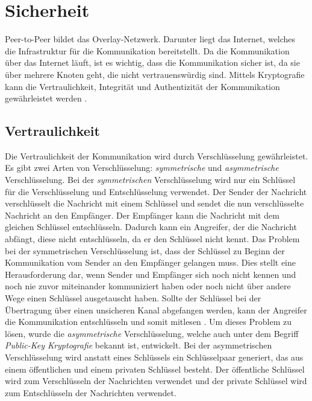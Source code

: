 \section{Sicherheit}
\label{sec:sicherheit_basics}


Peer-to-Peer bildet das Overlay-Netzwerk. Darunter liegt das Internet, welches die Infrastruktur für die Kommunikation bereitstellt. Da die Kommunikation über das Internet läuft, ist es wichtig, dass die Kommunikation sicher ist, da sie über mehrere Knoten geht, die nicht vertrauenswürdig sind. Mittels Kryptografie kann die Vertraulichkeit, Integrität und Authentizität der Kommunikation gewährleistet werden \Parencite[S. 7]{Hellmann_IT-Sicherheit}. 

\subsection{Vertraulichkeit}

Die Vertraulichkeit der Kommunikation wird durch Verschlüsselung gewährleistet. Es gibt zwei Arten von Verschlüsselung: \textit{symmetrische} und \textit{asymmetrische} Verschlüsselung. Bei der \textit{symmetrischen} Verschlüsselung wird nur ein Schlüssel für die Verschlüsselung und Entschlüsselung verwendet. Der Sender der Nachricht verschlüsselt die Nachricht mit einem Schlüssel und sendet die nun verschlüsselte Nachricht an den Empfänger. Der Empfänger kann die Nachricht mit dem gleichen Schlüssel entschlüsseln. Dadurch kann ein Angreifer, der die Nachricht abfängt, diese nicht entschlüsseln, da er den Schlüssel nicht kennt. Das Problem bei der symmetrischen Verschlüsselung ist, dass der Schlüssel zu Beginn der Kommunikation vom Sender an den Empfänger gelangen muss. Dies stellt eine Herausforderung dar, wenn Sender und Empfänger sich noch nicht kennen und noch nie zuvor miteinander kommuniziert haben oder noch nicht über andere Wege einen Schlüssel ausgetauscht haben. Sollte der Schlüssel bei der Übertragung über einen unsicheren Kanal abgefangen werden, kann der Angreifer die Kommunikation entschlüsseln und somit mitlesen \Parencites[S. 644]{DiffieHellman_NewDirectionsInCryptography}[S. 5-8]{Wong_KryptoPraxis}. Um dieses Problem zu lösen, wurde die \textit{asymmetrische} Verschlüsselung, welche auch unter dem Begriff \textit{Public-Key Kryptografie} bekannt ist, entwickelt. Bei der asymmetrischen Verschlüsselung wird anstatt eines Schlüssels ein Schlüsselpaar generiert, das aus einem öffentlichen und einem privaten Schlüssel besteht. Der öffentliche Schlüssel wird zum Verschlüsseln der Nachrichten verwendet und der private Schlüssel wird zum Entschlüsseln der Nachrichten verwendet. 

